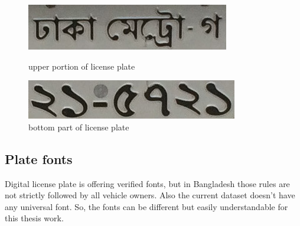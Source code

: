 	\begin{figure}[ht]
    \centering
    \includegraphics[scale=0.8]{./img/up}
    \caption{upper portion of license plate}
	\label{fig:UP}
    
    \includegraphics[scale=0.8]{./img/down}
    \caption{bottom part of license plate}
	\label{fig:DOWN}
    
    \end{figure} 
\subsection{Plate fonts}
Digital license plate is offering verified fonts, but in Bangladesh those rules are not strictly followed by all vehicle owners. Also the current dataset doesn't have any universal font. So, the fonts can be different but easily understandable for this thesis work.
